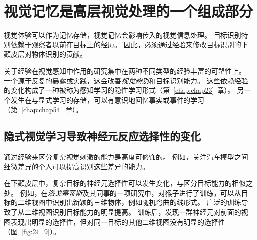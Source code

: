 \section{视觉记忆是高层视觉处理的一个组成部分}

视觉体验可以作为记忆存储，视觉记忆会影响传入的视觉信息处理。
目标识别特别依赖于观察者以前在目标上的经历。
因此，必须通过经验来修改目标识别的下颞皮层对物体识别的贡献。


关于经验在视觉感知中作用的研究集中在两种不同类型的经验丰富的可塑性上。
一个源于反复的暴露或实践，这会改善\textit{视觉辨别}和目标识别能力。
这些依赖经验的变化构成了一种被称为感知学习的隐性学习形式（第~\ref{chap:chap23}~章）。
另一个发生在与显式学习的存储，可以有意识地回忆事实或事件的学习（第~\ref{chap:chap54}~章）。



\subsection{隐式视觉学习导致神经元反应选择性的变化}

通过经验来区分复杂视觉刺激的能力是高度可修饰的。
例如，关注汽车模型之间细微差异的个人可以提高识别这些差异的能力。


在下颞皮层中，复杂目标的神经元选择性可以发生变化，与区分目标能力的相似之处。
例如，在\textit{洛戈塞蒂斯}及其同事的一项研究中，对猴子进行了训练，可以从目标的二维视图中识别出新颖的三维物体，例如随机弯曲的线形式。
广泛的训练导致了从二维视图识别目标能力的明显提高。
训练后，发现一群神经元对前面的视图表现出明显的选择性，但对同一目标的其他二维视图没有明显的选择性（图~\ref{fig:24_9}）。



